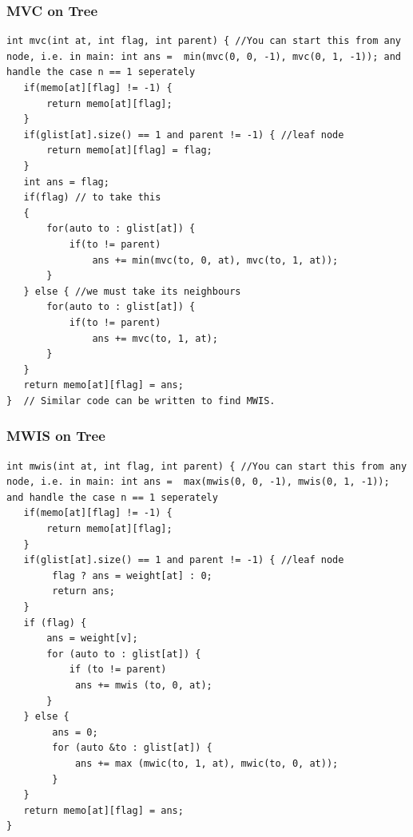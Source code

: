 \documentclass[8pt, a4paper, oneside, twocolumn]{extarticle}
\begin{document}
\subsubsection{MVC on Tree}
\begin{verbatim}
int mvc(int at, int flag, int parent) { //You can start this from any node, i.e. in main: int ans =  min(mvc(0, 0, -1), mvc(0, 1, -1)); and handle the case n == 1 seperately
   if(memo[at][flag] != -1) {
       return memo[at][flag];
   }
   if(glist[at].size() == 1 and parent != -1) { //leaf node
       return memo[at][flag] = flag;
   }
   int ans = flag;
   if(flag) // to take this
   {
       for(auto to : glist[at]) {
           if(to != parent)
               ans += min(mvc(to, 0, at), mvc(to, 1, at));
       }
   } else { //we must take its neighbours
       for(auto to : glist[at]) {
           if(to != parent)
               ans += mvc(to, 1, at);
       }
   }
   return memo[at][flag] = ans;
}  // Similar code can be written to find MWIS.
\end{verbatim}
\subsubsection{MWIS on Tree}
\begin{verbatim}
int mwis(int at, int flag, int parent) { //You can start this from any node, i.e. in main: int ans =  max(mwis(0, 0, -1), mwis(0, 1, -1)); and handle the case n == 1 seperately
   if(memo[at][flag] != -1) {
       return memo[at][flag];
   }
   if(glist[at].size() == 1 and parent != -1) { //leaf node
        flag ? ans = weight[at] : 0;
        return ans;
   }
   if (flag) {
       ans = weight[v];
       for (auto to : glist[at]) {
           if (to != parent)
            ans += mwis (to, 0, at);
       }
   } else {
        ans = 0;
        for (auto &to : glist[at]) {
            ans += max (mwic(to, 1, at), mwic(to, 0, at));
        }
   }
   return memo[at][flag] = ans;
}  
\end{verbatim}
\end{document}
